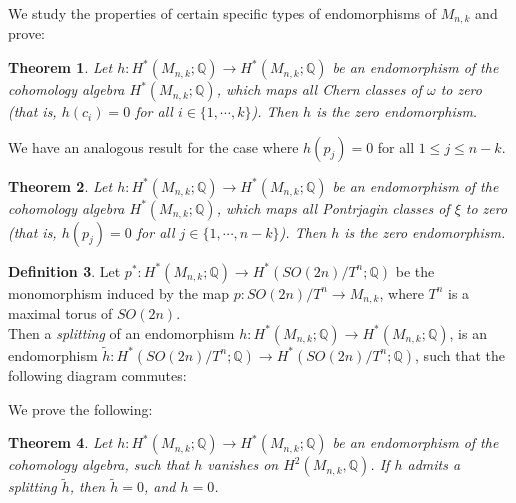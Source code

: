 \documentclass[a4paper,leqno,12pt]{amsart}
\theoremstyle{plain}
\newtheorem{thm}{Theorem}[section]
\theoremstyle{definition}
\newtheorem{defn}[thm]{Definition}
\theoremstyle{remark}
\newcommand{\Q}{\mathbb{Q}}
\begin{document}
 \noindent
We study the properties of certain specific types of endomorphisms of $M_{n,k}$ and prove: 

\begin{thm} \label{prop61}
Let $h \colon H^{*} (M_{n,k} ; \Q) \rightarrow H^{*} (M_{n,k} ; \Q)$ be an endomorphism of the cohomology algebra   $H^{*} (M_{n,k} ; \Q)$,  which maps all Chern classes of $\omega$ to zero (that is,  $h(c_{i}) = 0$ for all $i \in \{1,  \cdots ,  k \}$).  Then $h$ is the zero endomorphism.  
\end{thm}

\noindent
We have an analogous result for the case where $h(p_{j}) = 0$ for all $1 \leq j \leq n-k$. 
 \begin{thm} \label{prop62}
Let $h \colon H^{*} (M_{n,k} ; \Q) \rightarrow H^{*} (M_{n,k} ; \Q)$ be an endomorphism of the cohomology algebra   $H^{*} (M_{n,k} ; \Q)$,  which maps all Pontrjagin classes of $\xi$ to zero (that is,  $h(p_{j}) = 0$ for all $j \in \{1,  \cdots ,  n-k \}$).  Then $h$ is the zero endomorphism.  
\end{thm}

\noindent
\begin{defn}
Let $p^{*} \colon H^{*}(M_{n,k} ; \Q) \rightarrow H^{*}( SO(2n)/ T^{n}; \Q)$ be the monomorphism induced by the map $p \colon SO(2n)/ T^{n}  \longrightarrow  M_{n,k}$,  where $T^{n}$ is a maximal torus of $SO(2n)$.  \\
Then a {\it splitting} of an endomorphism $h: H^{*}( M_{n,k} ; \Q) \to H^{*}(M_{n,k} ; \Q)$,  is an endomorphism $\widetilde{h}: H^{*}( SO(2n)/ T^{n}; \Q) \longrightarrow H^{*}( SO(2n)/ T^{n}; \Q)$,  such that the following diagram commutes: \\

\end{defn}

\noindent
 We prove the following: 
 
 \begin{thm} \label{prop63}
Let $h:H^{*}(M_{n,k}; \Q) \to H^{*}(M_{n,k}; \Q)$  be an endomorphism of the cohomology algebra,  such that $h$ vanishes on $H^{2}(M_{n,k} ,  \Q)$.   If $h$ admits a splitting $\widetilde{h}$,   then $\widetilde{h} =0$,  and $h =0$. 
\end{thm}
\end{document}
